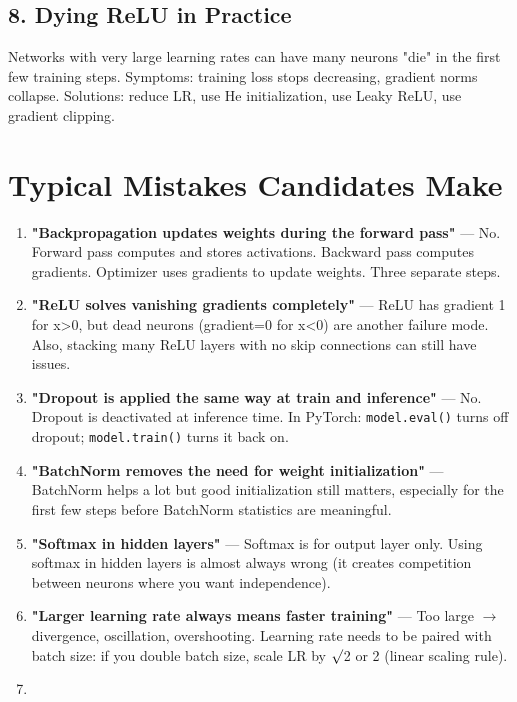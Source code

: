 \documentclass[11pt]{article}
\begin{document}
\subsection{8. Dying ReLU in Practice}\label{8-dying-relu-in-practice}

Networks with very large learning rates can have many neurons "die" in the first few training steps. Symptoms: training loss stops decreasing, gradient norms collapse. Solutions: reduce LR, use He initialization, use Leaky ReLU, use gradient clipping.

\section{Typical Mistakes Candidates Make}\label{typical-mistakes-candidates-make}

\begin{enumerate}
\def\labelenumi{\arabic{enumi}.}
\item
  \textbf{"Backpropagation updates weights during the forward pass"} --- No. Forward pass computes and stores activations. Backward pass computes gradients. Optimizer uses gradients to update weights. Three separate steps.
\item
  \textbf{"ReLU solves vanishing gradients completely"} --- ReLU has gradient 1 for x\textgreater0, but dead neurons (gradient=0 for x\textless0) are another failure mode. Also, stacking many ReLU layers with no skip connections can still have issues.
\item
  \textbf{"Dropout is applied the same way at train and inference"} --- No. Dropout is deactivated at inference time. In PyTorch: \texttt{model.eval()} turns off dropout; \texttt{model.train()} turns it back on.
\item
  \textbf{"BatchNorm removes the need for weight initialization"} --- BatchNorm helps a lot but good initialization still matters, especially for the first few steps before BatchNorm statistics are meaningful.
\item
  \textbf{"Softmax in hidden layers"} --- Softmax is for output layer only. Using softmax in hidden layers is almost always wrong (it creates competition between neurons where you want independence).
\item
  \textbf{"Larger learning rate always means faster training"} --- Too large \(\rightarrow\) divergence, oscillation, overshooting. Learning rate needs to be paired with batch size: if you double batch size, scale LR by \(\surd\)2 or 2 (linear scaling rule).
\item

\end{enumerate}
\end{document}
